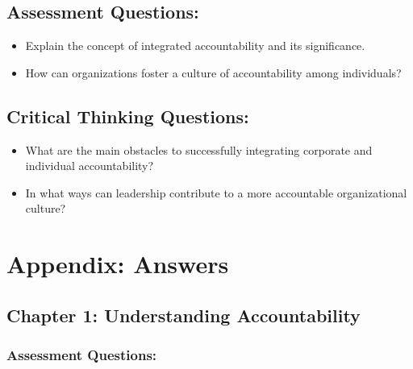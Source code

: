 \documentclass[
  letterpaper,
  DIV=11,
  numbers=noendperiod]{scrreprt}
\begin{document}
\subsection{Assessment Questions:}\label{assessment-questions-5}

\begin{itemize}
\item
  Explain the concept of integrated accountability and its significance.
\item
  How can organizations foster a culture of accountability among
  individuals?
\end{itemize}

\subsection{Critical Thinking
Questions:}\label{critical-thinking-questions-5}

\begin{itemize}
\item
  What are the main obstacles to successfully integrating corporate and
  individual accountability?
\item
  In what ways can leadership contribute to a more accountable
  organizational culture?
\end{itemize}

\section{Appendix: Answers}\label{appendix-answers}

\subsection{Chapter 1: Understanding
Accountability}\label{chapter-1-understanding-accountability}

\subsubsection{Assessment Questions:}\label{assessment-questions-6}
\end{document}
